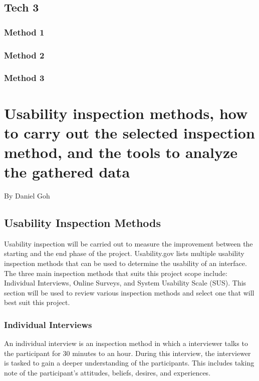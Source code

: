 \documentclass[10pt,journal,compsoc,draftclsnofoot]{IEEEtran}
\begin{document}
\subsection{Tech 3}

\subsubsection{Method 1}

\subsubsection{Method 2}

\subsubsection{Method 3}

\newpage


\section{Usability inspection methods, how to carry out the selected inspection method, and the tools to analyze the gathered data}
\large{By Daniel Goh}

\normalsize
\subsection{Usability Inspection Methods}
Usability inspection will be carried out to measure the improvement between the starting and the end phase of the project.
Usability.gov lists multiple usability inspection methods that can be used to determine the usability of an interface.
The three main inspection methods that suits this project scope include: Individual Interviews, Online Surveys, and System Usability Scale (SUS). \cite{userResearch}
This section will be used to review various inspection methods and select one that will best suit this project.

\subsubsection{Individual Interviews \cite{userResearch}}
An individual interview is an inspection method in which a interviewer talks to the participant for 30 minutes to an hour.
During this interview, the interviewer is tasked to gain a deeper understanding of the participants.
This includes taking note of the participant's attitudes, beliefs, desires, and experiences.
\end{document}
